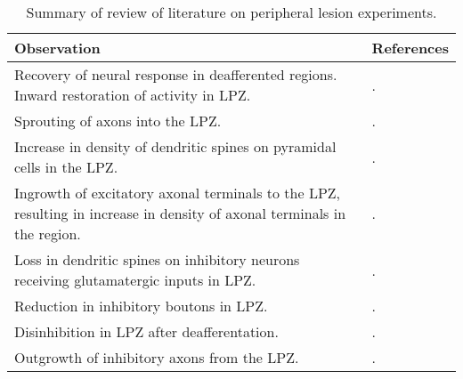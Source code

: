 \tiny{
\begin{table}[t]
  \centering
  \caption{Summary of review of literature on peripheral lesion experiments.}\label{tab:strp-lit-review}
  \begin{tabularx}{\textwidth}{XX}
    \toprule%
    \textbf{Observation} & \textbf{References} \\
    \midrule%
    \midrule%
    Recovery of neural response in deafferented regions. Inward restoration of activity in LPZ\@. & \textcite{Rasmusson1982,Merzenich1984,Calford1988,Heinen1991,Gilbert1992,Pons1991,Rajan1993,Florence1998}. \\
    \midrule%
    Sprouting of axons into the LPZ\@. & \textcite{DarianSmith1994,DarianSmith1995}. \\
    \midrule%
    Increase in density of dendritic spines on pyramidal cells in the LPZ\@. & \textcite{Keck2008}. \\
    \midrule%
    Ingrowth of excitatory axonal terminals to the LPZ, resulting in increase in density of axonal terminals in the region. & \textcite{Yamahachi2009}. \\
    \midrule%
    Loss in dendritic spines on inhibitory neurons receiving glutamatergic inputs in LPZ\@. & \textcite{Keck2011}. \\
    \midrule%
    Reduction in inhibitory boutons in LPZ\@. & \textcite{Keck2011}. \\
    \midrule%
    Disinhibition in LPZ after deafferentation. & \textcite{Chen2011,Keck2011}. \\
    \midrule%
    Outgrowth of inhibitory axons from the LPZ\@. & \textcite{Marik2010,Marik2014}. \\
    \bottomrule%
  \end{tabularx}
\end{table}
}
